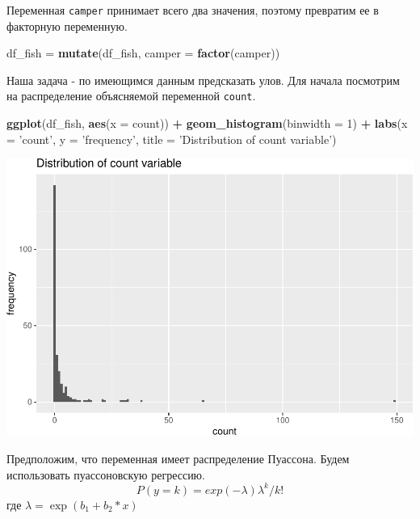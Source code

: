 \documentclass[]{book}
\newenvironment{Shaded}{\begin{snugshade}}{\end{snugshade}}
\newcommand{\DataTypeTok}[1]{\textcolor[rgb]{0.13,0.29,0.53}{#1}}
\newcommand{\DecValTok}[1]{\textcolor[rgb]{0.00,0.00,0.81}{#1}}
\newcommand{\KeywordTok}[1]{\textcolor[rgb]{0.13,0.29,0.53}{\textbf{#1}}}
\newcommand{\NormalTok}[1]{#1}
\newcommand{\OperatorTok}[1]{\textcolor[rgb]{0.81,0.36,0.00}{\textbf{#1}}}
\newcommand{\StringTok}[1]{\textcolor[rgb]{0.31,0.60,0.02}{#1}}
\begin{document}
Переменная \texttt{camper} принимает всего два значения, поэтому превратим ее в факторную переменную.

\begin{Shaded}
\begin{Highlighting}[]
\NormalTok{df_fish =}\StringTok{ }\KeywordTok{mutate}\NormalTok{(df_fish, }\DataTypeTok{camper =} \KeywordTok{factor}\NormalTok{(camper))}
\end{Highlighting}
\end{Shaded}

Наша задача - по имеющимся данным предсказать улов. Для начала посмотрим на распределение объясняемой переменной \texttt{count}.

\begin{Shaded}
\begin{Highlighting}[]
\KeywordTok{ggplot}\NormalTok{(df_fish, }\KeywordTok{aes}\NormalTok{(}\DataTypeTok{x =}\NormalTok{ count)) }\OperatorTok{+}\StringTok{ }
\StringTok{  }\KeywordTok{geom_histogram}\NormalTok{(}\DataTypeTok{binwidth =} \DecValTok{1}\NormalTok{) }\OperatorTok{+}\StringTok{ }
\StringTok{  }\KeywordTok{labs}\NormalTok{(}\DataTypeTok{x =} \StringTok{'count'}\NormalTok{, }\DataTypeTok{y =} \StringTok{'frequency'}\NormalTok{, }\DataTypeTok{title =} \StringTok{'Distribution of count variable'}\NormalTok{)}
\end{Highlighting}
\end{Shaded}

\includegraphics{05-poisreg_files/figure-latex/hist-1.pdf}

Предположим, что переменная имеет распределение Пуассона. Будем использовать пуассоновскую регрессию.
\[
P(y=k)=exp(-\lambda) \lambda^k / k!
\]
где \(\lambda=\exp(b_1 +b_2*x)\)
\end{document}

